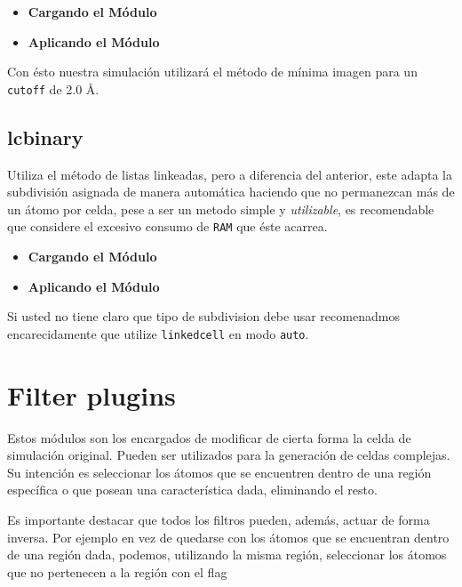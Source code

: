 \begin{itemize}
 \item \textbf{Cargando el M\'odulo}
 \item \textbf{Aplicando el M\'odulo}
\end{itemize}

Con \'esto nuestra simulaci\'on utilizar\'a el m\'etodo de m\'inima imagen para
un \verb|cutoff| de 2.0 \AA.

\subsection{lcbinary}
Utiliza el m\'etodo de listas linkeadas, pero a diferencia del anterior, este
adapta la subdivisi\'on asignada de manera autom\'atica haciendo que no
permanezcan m\'as de un \'atomo por celda, pese a ser un metodo simple y
\textit{utilizable}, es recomendable que considere el excesivo consumo de
\verb|RAM| que \'este acarrea.

\begin{itemize}
 \item \textbf{Cargando el M\'odulo}
 \item \textbf{Aplicando el M\'odulo}
\end{itemize}

Si usted no tiene claro que tipo de subdivision debe usar recomenadmos
encarecidamente que utilize \verb|linkedcell| en modo \verb|auto|.
\section{Filter plugins}
Estos m\'odulos son los encargados de modificar de cierta forma la celda de
simulaci\'on original. Pueden ser utilizados para la generaci\'on de celdas
complejas. Su intenci\'on es seleccionar los \'atomos que se encuentren dentro
de una regi\'on espec\'ifica o que posean una caracter\'istica dada, eliminando
el resto.

Es importante destacar que todos los filtros pueden, adem\'as, actuar de forma
inversa. Por ejemplo en vez de quedarse con los \'atomos que se encuentran
dentro de una regi\'on dada, podemos, utilizando la misma regi\'on, seleccionar
los \'atomos que no pertenecen a la regi\'on con el flag

